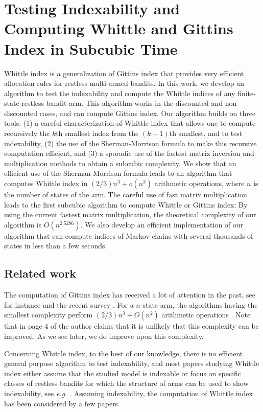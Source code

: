 \chapter{Testing Indexability and Computing Whittle and Gittins Index in Subcubic Time}
\label{ch:index_computation}

Whittle index is a generalization of Gittins index that provides very efficient allocation rules for restless multi-armed bandits. In this work, we develop an algorithm to test the indexability and compute the Whittle indices of any finite-state restless bandit arm. This algorithm works in the discounted and non-discounted cases, and can compute Gittins index. Our algorithm builds on three tools: (1) a careful characterization of Whittle index that allows one to compute recursively the $k$th smallest index from the $(k-1)$th smallest, and to test indexability, (2) the use of the Sherman-Morrison formula to make this recursive computation efficient, and (3) a sporadic use of the fastest matrix inversion and multiplication methods to obtain a subcubic complexity. We show that an efficient use of the Sherman-Morrison formula leads to an algorithm that computes Whittle index in $(2/3)n^3 + o(n^3)$ arithmetic operations, where $n$ is the number of states of the arm.  The careful use of fast matrix multiplication leads to the first subcubic algorithm to compute Whittle or Gittins index: By using the current fastest matrix multiplication, the theoretical complexity of our algorithm is $O(n^{2.5286})$. We also develop an efficient implementation of our algorithm that can compute indices of Markov chains with several thousands of states in less than a few seconds.

\section{Related work}

The computation of Gittins index has received a lot of attention in the past, see for instance \cite{chen1986linear, katehakis1987multi, nino20072, sonin2008generalized} and the recent survey \cite{chakravorty2014multi}. For a $n$-state arm, the algorithms having the smallest complexity perform $(2/3)n^3+O(n^2)$ arithmetic operations \cite{chakravorty2014multi}. Note that in page $4$ of \cite{nino2020fast} the author claims that it is unlikely that this complexity can be improved. As we see later, we do improve upon this complexity. 

Concerning Whittle index, to the best of our knowledge, there is no efficient general purpose algorithm to test indexability, and most papers studying Whittle index either assume that the studied model is indexable or focus on specific classes of restless bandits for which the structure of arms can be used to show indexability, see \emph{e.g.} \cite{aalto2011properties,akbarzadeh2019restless,akbarzadeh2021maintenance,borkar2017whittle}.  Assuming indexability, the computation of Whittle index has been considered by a few papers.

